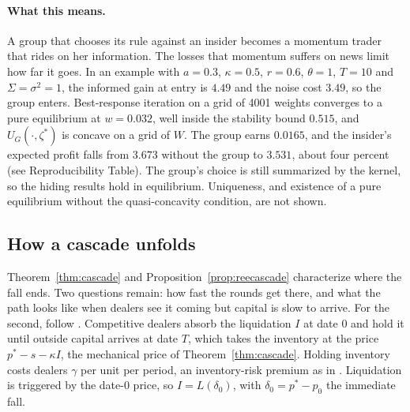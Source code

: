 \paragraph{What this means.} A group that chooses its rule against an insider becomes a momentum trader that rides on her information. The losses that momentum suffers on news limit how far it goes. In an example with $a=0.3$, $\kappa=0.5$, $r=0.6$, $\theta=1$, $T=10$ and $\Sigma=\sigma^2=1$, the informed gain at entry is $4.49$ and the noise cost $3.49$, so the group enters. Best-response iteration on a grid of 4001 weights converges to a pure equilibrium at $w=0.032$, well inside the stability bound $0.515$, and $U_G(\cdot,\zeta^*)$ is concave on a grid of $W$. The group earns $0.0165$, and the insider's expected profit falls from $3.673$ without the group to $3.531$, about four percent (see Reproducibility Table). The group's choice is still summarized by the kernel, so the hiding results hold in equilibrium. Uniqueness, and existence of a pure equilibrium without the quasi-concavity condition, are not shown.

\subsection{How a cascade unfolds}

Theorem~\ref{thm:cascade} and Proposition~\ref{prop:reecascade} characterize where the fall ends. Two questions remain: how fast the rounds get there, and what the path looks like when dealers see it coming but capital is slow to arrive. For the second, follow \citet{duffie2010}. Competitive dealers absorb the liquidation $I$ at date $0$ and hold it until outside capital arrives at date $T$, which takes the inventory at the price $p^*-s-\kappa I$, the mechanical price of Theorem~\ref{thm:cascade}. Holding inventory costs dealers $\gamma$ per unit per period, an inventory-risk premium as in \citet{grossman1988}. Liquidation is triggered by the date-$0$ price, so $I=L(\delta_0)$, with $\delta_0=p^*-p_0$ the immediate fall.

